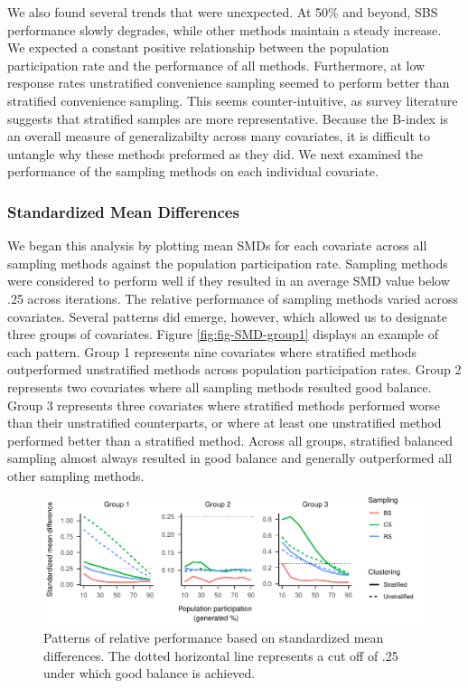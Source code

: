 \documentclass[english,man,floatsintext]{apa6}
\begin{document}
We also found several trends that were unexpected. At 50\% and beyond, SBS performance slowly degrades, while other methods maintain a steady increase. We expected a constant positive relationship between the population participation rate and the performance of all methods. Furthermore, at low response rates unstratified convenience sampling seemed to perform better than stratified convenience sampling. This seems counter-intuitive, as survey literature suggests that stratified samples are more representative. Because the B-index is an overall measure of generalizabilty across many covariates, it is difficult to untangle why these methods preformed as they did. We next examined the performance of the sampling methods on each individual covariate.

\hypertarget{standardized-mean-differences}{%
\subsubsection{Standardized Mean Differences}\label{standardized-mean-differences}}

We began this analysis by plotting mean SMDs for each covariate across all sampling methods against the population participation rate. Sampling methods were considered to perform well if they resulted in an average SMD value below .25 across iterations. The relative performance of sampling methods varied across covariates. Several patterns did emerge, however, which allowed us to designate three groups of covariates. Figure \ref{fig:fig-SMD-group1} displays an example of each pattern. Group 1 represents nine covariates where stratified methods outperformed unstratified methods across population participation rates. Group 2 represents two covariates where all sampling methods resulted good balance. Group 3 represents three covariates where stratified methods performed worse than their unstratified counterparts, or where at least one unstratified method performed better than a stratified method. Across all groups, stratified balanced sampling almost always resulted in good balance and generally outperformed all other sampling methods.



\begin{figure}
\centering
\includegraphics{6---Paper_files/figure-latex/fig-SMD-groups-1.pdf}
\caption{\label{fig:fig-SMD-groups}Patterns of relative performance based on standardized mean differences. The dotted horizontal line represents a cut off of .25 under which good balance is achieved.}
\end{figure}
\end{document}

